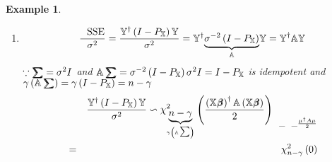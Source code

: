 \documentclass{article}
\newtheorem{example}[theorem]{Example}
\begin{document}
\begin{example}
\begin{enumerate}
\item 
\begin{equation*}
\frac{\text{SSE}}{\sigma ^{2}}=\frac{\mathbb{Y}^{\dagger }\left( I-P_{%
\mathbb{X}}\right) \mathbb{Y}}{\sigma ^{2}}=\mathbb{Y}^{\dagger }\underset{%
\mathbb{A}}{\underbrace{\sigma ^{-2}\left( I-P_{\mathbb{X}}\right) }}\mathbb{%
Y=Y}^{\dagger }\mathbb{AY}
\end{equation*}%
$\because 
\tsum\mkern-20mu\tsum%
=\sigma ^{2}I$ and $\mathbb{A}%
\tsum\mkern-20mu\tsum%
=\sigma ^{-2}\left( I-P_{\mathbb{X}}\right) \sigma ^{2}I=I-P_{\mathbb{X}}$
is idempotent and $\gamma \left( \mathbb{A}%
\tsum\mkern-20mu\tsum%
\right) =\gamma \left( I-P_{\mathbb{X}}\right) =n-\gamma $%
\begin{eqnarray*}
&\therefore &\frac{\mathbb{Y}^{\dagger }\left( I-P_{\mathbb{X}}\right) 
\mathbb{Y}}{\sigma ^{2}}\backsim \chi _{\underset{\gamma \left( \mathbb{A}%
\tsum \right) }{\underbrace{n-\gamma }}}^{2}\left( \frac{\left( \mathbb{X}%
\beta\mkern-9.6mu \beta%
\right) ^{\dagger }\mathbb{A}\left( \mathbb{X}%
\beta\mkern-9.6mu \beta%
\right) }{2}\right) _{\_\_\frac{\mu ^{\dagger }A\mu }{2}} \\
&=&\chi _{n-\gamma }^{2}\left( 0\right) 
\end{eqnarray*}


\end{enumerate}
\end{example}
\end{document}
